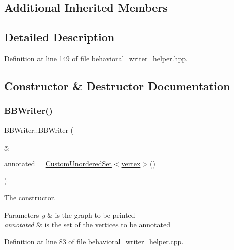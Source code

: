 \subsection*{Additional Inherited Members}


\subsection{Detailed Description}


Definition at line 149 of file behavioral\+\_\+writer\+\_\+helper.\+hpp.



\subsection{Constructor \& Destructor Documentation}
\mbox{\label{classBBWriter_a9166ba1742ef1a0809b65fbcd2c5f1a1}} 
\subsubsection{\texorpdfstring{B\+B\+Writer()}{BBWriter()}}
{\footnotesize\ttfamily B\+B\+Writer\+::\+B\+B\+Writer (\begin{DoxyParamCaption}\item[{const \hyperlink{structBBGraph}{B\+B\+Graph} $\ast$}]{g,  }\item[{\hyperlink{classCustomUnorderedSet}{Custom\+Unordered\+Set}$<$ \hyperlink{graph_8hpp_abefdcf0544e601805af44eca032cca14}{vertex} $>$}]{annotated = {\ttfamily \hyperlink{classCustomUnorderedSet}{Custom\+Unordered\+Set}$<$\hyperlink{graph_8hpp_abefdcf0544e601805af44eca032cca14}{vertex}$>$()} }\end{DoxyParamCaption})}



The constructor. 


\begin{DoxyParams}{Parameters}
{\em g} & is the graph to be printed \\
\hline
{\em annotated} & is the set of the vertices to be annotated \\
\hline
\end{DoxyParams}


Definition at line 83 of file behavioral\+\_\+writer\+\_\+helper.\+cpp.



